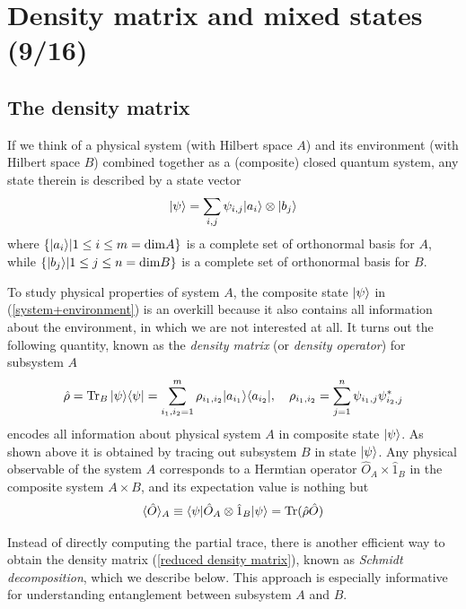 

\section{Density matrix and mixed states (9/16)}\label{sec:schmidt decomposition}




\subsection{The density matrix}

If we think of a physical system (with Hilbert space $A$) and its environment (with Hilbert space $B$) combined together as a (composite) closed quantum system, any state therein is described by a state vector
\begin{align}\label{system+environment}
|{\psi}\rangle=\sum_{i,j}\psi_{i,j}|{a_i}\rangle\otimes|{b_j}\rangle
\end{align}
where $\{|{a_i}\rangle|1\leq i\leq m=\text{dim}A\}$ is a complete set of orthonormal basis for $A$, while $\{|{b_j}\rangle|1\leq j\leq n=\text{dim}B\}$ is a complete set of orthonormal basis for $B$. 

To study physical properties of system $A$, the composite state $|{\psi}\rangle$ in (\ref{system+environment}) is an overkill because it also contains all information about the environment, in which we are not interested at all. It turns out the following quantity, known as the \emph{density matrix} (or \emph{density operator}) for subsystem $A$
\begin{align}\label{reduced density matrix}
\hat\rho=\operatorname{Tr}_B|{\psi}\rangle\langle{\psi}|=\sum_{i_1,i_2=1}^{m}\rho_{i_1,i_2}|{a_{i_1}}\rangle\langle{a_{i_2}}|,~~~\rho_{i_1,i_2}=\sum_{j=1}^n\psi_{i_1,j}\psi^\ast_{i_2,j}
\end{align}
encodes all information about physical system $A$ in composite state $|{\psi}\rangle$. As shown above it is obtained by tracing out subsystem $B$ in state $|{\psi}\rangle$. Any physical observable of the system $A$ corresponds to a Hermtian operator $\hat O_A\times\hat 1_B$ in the composite system $A\times B$, and its expectation value is nothing but
\begin{align}
    \langle{\hat O}\rangle_A\equiv\langle{\psi|\hat O_A\otimes\hat1_B|\psi}\rangle=\text{Tr}(\hat\rho\hat O)
\end{align}

Instead of directly computing the partial trace, there is another efficient way to obtain the density matrix (\ref{reduced density matrix}), known as \emph{Schmidt decomposition}, which we describe below. This approach is especially informative for understanding entanglement between subsystem $A$ and $B$. 

